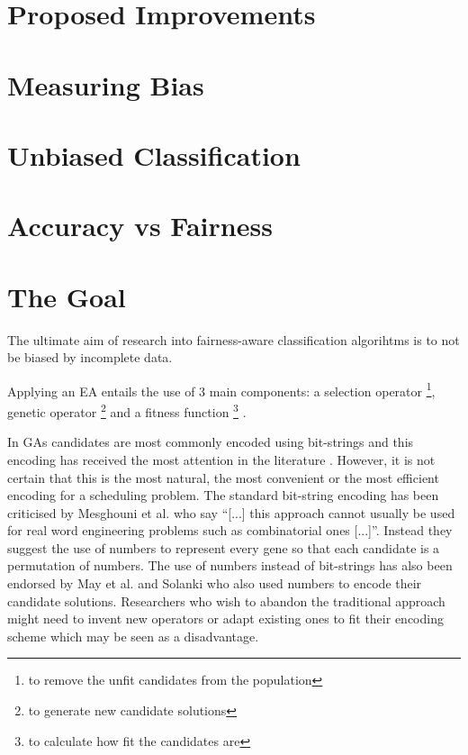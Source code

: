 \documentclass[a4paper, 12pt, titlepage]{article}
\begin{document}
\section*{Proposed Improvements}

\section*{Measuring Bias}

\section*{Unbiased Classification}

\section*{Accuracy vs Fairness}

\section*{The Goal}

The ultimate aim of research into fairness-aware classification algorihtms is to not be biased by incomplete data.

Applying an EA entails the use of 3 main components: a selection operator \footnote{to remove the unfit candidates from the population}, genetic operator \footnote{to generate new candidate solutions} and a fitness function \footnote{to calculate how fit the candidates are} \cite{mesghouni2004, yu2002, diveev2017, aljarrah2017, timilsina2015}.  

In GAs candidates are most commonly encoded using bit-strings \cite[p.~127]{norvig2010} and this encoding has received the most attention in the literature \cite[p.~103]{eberhart2007}.  However, it is not certain that this is the most natural, the most convenient or the most efficient encoding for a scheduling problem.  The standard bit-string encoding has been criticised by Mesghouni et al.  who say ``[...] this approach cannot usually be used for real word engineering problems such as combinatorial ones [...]''\cite[p.~93]{mesghouni2004}. Instead they suggest the use of numbers to represent every gene so that each candidate is a permutation of numbers.  The use of numbers instead of bit-strings has also been endorsed by May et al.  and Solanki who also used numbers to encode their candidate solutions. \cite[p.~7076]{may2015} \cite[p.~3868]{solanki2015} Researchers who wish to abandon the traditional approach might need to invent new operators or adapt existing ones to fit their encoding scheme which may be seen as a disadvantage.
\end{document}
